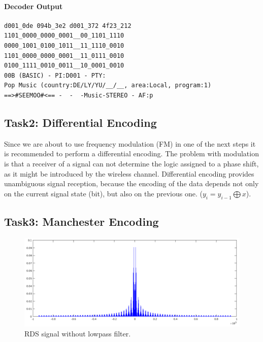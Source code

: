 \documentclass[sigconf]{acmart}
\begin{document}
\hypertarget{Decoderux20Output}{%
\paragraph{Decoder Output}\label{Decoderux20Output}}

\begin{verbatim}
d001_0de 094b_3e2 d001_372 4f23_212
1101_0000_0000_0001__00_1101_1110
0000_1001_0100_1011__11_1110_0010
1101_0000_0000_0001__11_0111_0010
0100_1111_0010_0011__10_0001_0010
00B (BASIC) - PI:D001 - PTY:
Pop Music (country:DE/LY/YU/__/__, area:Local, program:1)
==>#SEEMOO#<== -  -  -Music-STEREO - AF:p
\end{verbatim}

\hypertarget{Task2:ux20Differentialux20Encoding}{%
\subsection{Task2: Differential
Encoding}\label{Task2:ux20Differentialux20Encoding}}

Since we are about to use frequency modulation (FM) in one of the next
steps it is recommended to perform a differential encoding. The problem
with modulation is that a receiver of a signal can not determine the
logic assigned to a phase shift, as it might be introduced by the
wireless channel. Differential encoding provides unambiguous signal
reception, because the encoding of the data depends not only on the
current signal state (bit), but also on the previous one.
(\(y_i = y_{i-1} \bigoplus x\)).


\hypertarget{Task3:ux20Manchesterux20Encoding}{%
\subsection{Task3: Manchester
Encoding}\label{Task3:ux20Manchesterux20Encoding}}

\begin{figure}[tb!]
	\hfill
	\includegraphics[width=1\linewidth]{rds_plot.png}
	\caption{RDS signal without lowpass filter.}
	\label{fig:rds_plot}
\end{figure}
\end{document}
